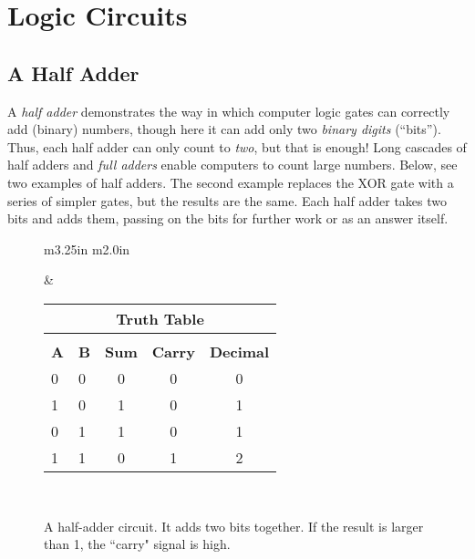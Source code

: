 \section{Logic Circuits}

\subsection*{A Half Adder}

A \emph{half adder} demonstrates the way in which computer logic gates can correctly add (binary) numbers, though here it can add only two \emph{binary digits} (``bits''). Thus, each half adder can only count to \emph{two}, but that is enough!  Long cascades of half adders and \emph{full adders} enable computers to count large numbers. Below, see two examples of half adders. The second example replaces the XOR gate with a series of simpler gates, but the results are the same. Each half adder takes two bits and adds them, passing on the bits for further work or as an answer itself.

\bigskip

\begin{figure}[!ht]
\begin{center}
\begin{tabular}{m{3.25in} m{2.0in}}



&

\begin{tabular}{ll | cc | c}
\multicolumn{5}{c}{\textbf{Truth Table}}\\
\hline\\[\negsep]
\textbf{A} & \textbf{B} & \textbf{Sum} & \textbf{Carry} & \textbf{Decimal}\\
\hline
0 & 0 & 0 & 0 & 0 \\
1 & 0 & 1  & 0 & 1 \\
0 & 1 & 1  & 0 & 1 \\
1 & 1 & 0  & 1 & 2 \\
\hline
\end{tabular}

\\

\end{tabular}

\caption{A half-adder circuit. It adds two bits together. If the result is larger than 1, the ``carry" signal is high.}
\end{center}
\end{figure}


